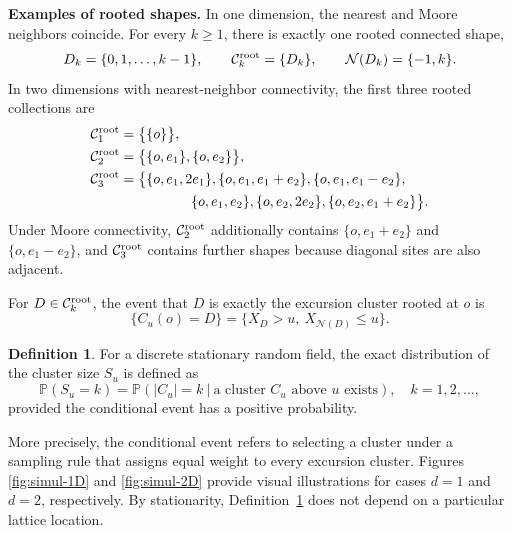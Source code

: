 \documentclass[aap,preprint]{imsart}
\theoremstyle{plain}
\theoremstyle{definition}
\newtheorem{definition}[theorem]{Definition}
\def\P{{\mathbb P}}
\begin{document}
	\noindent\textbf{Examples of rooted shapes.}
	In one dimension, the nearest and Moore neighbors coincide. For
	every $k\geq1$, there is exactly one rooted connected shape,
	\begin{equation}\label{eq:root-shapes-1d}
		D_k=\{0,1,\ldots,k-1\},
		\qquad
		\mathcal C_k^{\rm root}=\{D_k\},
		\qquad
		\mathcal N(D_k)=\{-1,k\}.
	\end{equation}
	In two dimensions with nearest-neighbor connectivity, the first three rooted
	collections are
	\begin{equation}\label{eq:root3}
		\begin{split}
			\mathcal{C}_1^{\rm root}
			&=\bigl\{\{o\}\bigr\},\\
			\mathcal{C}_2^{\rm root}
			&=\bigl\{\{o,e_1\},\{o,e_2\}\bigr\},\\
			\mathcal{C}_3^{\rm root}
			&=\bigl\{
			\{o,e_1,2e_1\},
			\{o,e_1,e_1+e_2\},
			\{o,e_1,e_1-e_2\},\\
			&\hspace{18mm}
			\{o,e_1,e_2\},
			\{o,e_2,2e_2\},
			\{o,e_2,e_1+e_2\}
			\bigr\}.
		\end{split}
	\end{equation}
	Under Moore connectivity, $\mathcal C_2^{\rm root}$ additionally contains
	$\{o,e_1+e_2\}$ and $\{o,e_1-e_2\}$, and
	$\mathcal C_3^{\rm root}$ contains further shapes because diagonal sites are
	also adjacent.
	
	For $D\in\mathcal{C}_k^{\rm root}$, the event that $D$ is exactly the
	excursion cluster rooted at $o$ is
	\begin{equation}\label{eq:C_u(o)}
	\{C_u(o)=D\}=\{X_D>u,\ X_{\mathcal{N}(D)}\le u\}.
    \end{equation}
	
	\begin{definition}\label{def:cluster-size} For a discrete stationary random field, the exact distribution of the cluster size $S_u$ is defined as 
		\begin{equation}\label{eq:CSD_def}
			\P(S_u=k)
			= \P(|C_u|=k \ | \ \text{a cluster $C_u$ above $u$ exists}), \quad k=1,2,\ldots,
		\end{equation}
		provided the conditional event has a positive probability. 
	\end{definition}
	More precisely, the conditional event refers to selecting a cluster under a sampling rule that assigns equal weight to every excursion cluster. Figures \ref{fig:simul-1D} and \ref{fig:simul-2D} provide visual illustrations for cases $d=1$ and $d=2$, respectively. By stationarity, Definition~\ref{def:cluster-size} does not depend on a
	particular lattice location. 
	
\end{document}
